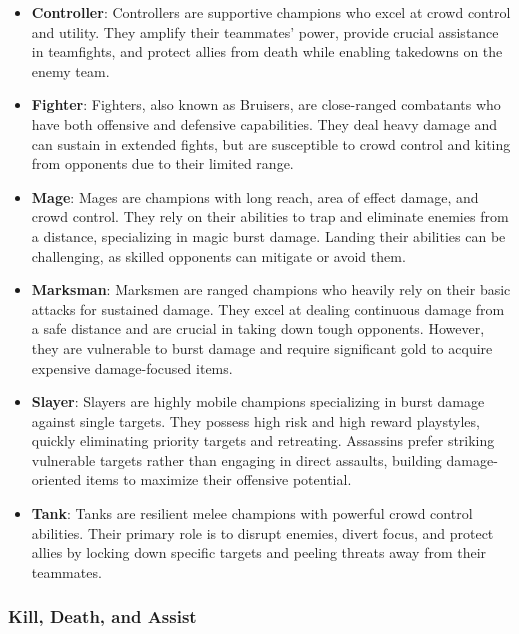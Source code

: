 \documentclass[11pt,a4paper,oneside]{report}
\begin{document}
\begin{itemize}
  \item \textbf{Controller}: Controllers are supportive champions who excel at crowd control and utility. They amplify their teammates' power, provide crucial assistance in teamfights, and protect allies from death while enabling takedowns on the enemy team.

  \item \textbf{Fighter}: Fighters, also known as Bruisers, are close-ranged combatants who have both offensive and defensive capabilities. They deal heavy damage and can sustain in extended fights, but are susceptible to crowd control and kiting from opponents due to their limited range.

  \item \textbf{Mage}: Mages are champions with long reach, area of effect damage, and crowd control. They rely on their abilities to trap and eliminate enemies from a distance, specializing in magic burst damage. Landing their abilities can be challenging, as skilled opponents can mitigate or avoid them.

  \item \textbf{Marksman}: Marksmen are ranged champions who heavily rely on their basic attacks for sustained damage. They excel at dealing continuous damage from a safe distance and are crucial in taking down tough opponents. However, they are vulnerable to burst damage and require significant gold to acquire expensive damage-focused items.

  \item \textbf{Slayer}: Slayers are highly mobile champions specializing in burst damage against single targets. They possess high risk and high reward playstyles, quickly eliminating priority targets and retreating. Assassins prefer striking vulnerable targets rather than engaging in direct assaults, building damage-oriented items to maximize their offensive potential.

  \item \textbf{Tank}: Tanks are resilient melee champions with powerful crowd control abilities. Their primary role is to disrupt enemies, divert focus, and protect allies by locking down specific targets and peeling threats away from their teammates.
\end{itemize}

\subsubsection{Kill, Death, and Assist}
\end{document}
